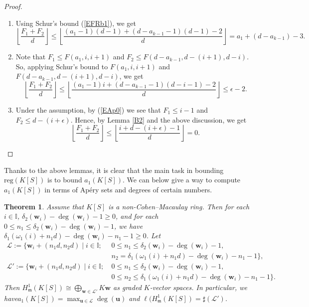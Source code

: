 \documentclass[11pt]{article}
\newtheorem{Theorem}{Theorem}[section]
\def\deg{\operatorname{deg}}
\def\reg{\mathrm{reg}}
\def\mfr{{\frak m}}
\def\ubf{{\mathbf u}}
\def\wbf{{\mathbf w}}
\def\mfr{{\mathfrak m}}
\def\Lcal{{\mathcal L}}
\def\Iset{{\mathbb I}}
\theoremstyle{remark}
\theoremstyle{definition}
\begin{document}
\begin{proof}
\begin{enumerate}[\((i)\)]
    \item Using Schur's bound (\ref{EFRb1}), we get
$$\left\lfloor \frac{F_1+F_2}{d} \right\rfloor \leq \left\lfloor \frac{(a_1-1) (d-1) + (d-a_{k-1}-1)(d-1) - 2 }{d} \right\rfloor  = a_1 + (d-a_{k-1}) - 3.$$
\item Note that $F_1 \leq F(a_1, i, i+1)$ and $F_2 \leq F(d-a_{k-1}, d- (i+1), d-i)$. So, applying Schur's bound to $F(a_1, i, i+1)$ and $ F(d-a_{k-1}, d- (i+1), d-i)$, we get
$$\left\lfloor \frac{F_1+F_2}{d} \right\rfloor \leq \left\lfloor \frac{(a_1-1)i + (d-a_{k-1} - 1)(d-i-1) - 2 }{d} \right\rfloor \leq \epsilon - 2.$$
\item Under the assumption, by (\ref{EAp0}) we see that $F_1 \leq i-1$ and $F_2 \leq d-( i+\epsilon )$. Hence, by Lemma \ref{B2} and the above discussion, we get
 $$\left\lfloor \frac{F_1+F_2}{d} \right\rfloor  \leq \left\lfloor \frac{i + d-(i+\epsilon) - 1}{d} \right\rfloor  = 0.$$
\end{enumerate}
\end{proof}
Thanks to the above lemmas, it is clear that the main task in  bounding $\reg(K[S])$  is to bound $a_1(K[S])$. 
We can below give a way to compute $a_1(K[S])$ in terms of Ap\'ery sets and degrees of certain numbers.

\begin{Theorem} \label{A4a}  Assume that $K[S]$ is a non-Cohen--Macaulay ring. Then  for each $i \in \Iset$, $\delta_2(\wbf_i) - \deg(\wbf_i) - 1\geq 0$, and for each $0\leq n_1 \le \delta_2(\wbf_i) - \deg(\wbf_i) - 1$, we have $ \delta_1(\omega_1(i) + n_1d) - \deg(\wbf_i) - n_1 -1 \geq 0$.
Let
$$\begin{array}{ll}
\Lcal :=  \{\wbf_i + (n_1d, n_2d)\mid i\in \Iset;\ & 0\leq n_1 \le \delta_2(\wbf_i) - \deg(\wbf_i) - 1,\\
& n_2 =  \delta_1(\omega_1(i) + n_1d) - \deg(\wbf_i) - n_1 -1\},\\
\Lcal' :=  \{\wbf_i + (n_1d, n_2d)\mid i\in \Iset;\ & 0\leq n_1 \le \delta_2(\wbf_i) - \deg(\wbf_i) - 1,\\
& 0\le n_2 \le  \delta_1(\omega_1(i) + n_1d) - \deg(\wbf_i) - n_1 -1\}.
\end{array}$$
Then $H^1_{\mfr}(K[S]) \cong \bigoplus_{\wbf\in \Lcal'} K\wbf$ as graded $K$-vector spaces. In particular, we have\newline $a_1(K[S]) = \max_{\ubf \in \Lcal} \deg(\ubf)$ and $\ell(H^1_{\mfr}(K[S]) = \sharp (\Lcal')$.
\end{Theorem}
\end{document}
